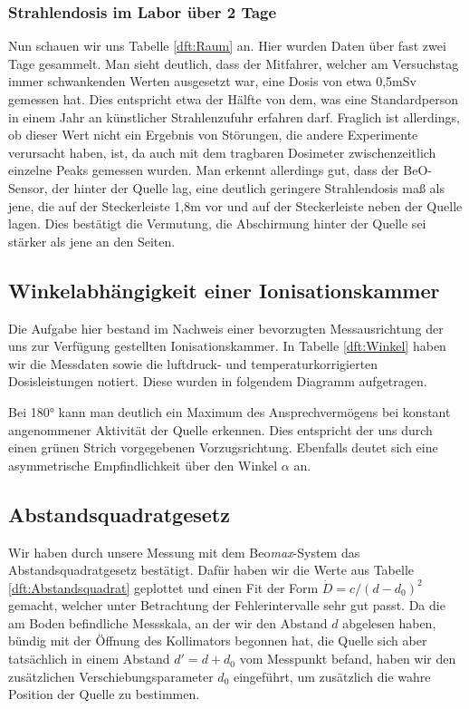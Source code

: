 \subsubsection{Strahlendosis im Labor über 2 Tage}
Nun schauen wir uns Tabelle \ref{dft:Raum} an. Hier wurden Daten über fast zwei Tage gesammelt. Man sieht 
deutlich, dass der Mitfahrer, welcher am Versuchstag immer schwankenden Werten ausgesetzt war, eine Dosis von 
etwa 0,5mSv gemessen hat. Dies entspricht etwa der Hälfte von dem, was eine Standardperson in einem Jahr an 
künstlicher Strahlenzufuhr erfahren darf. Fraglich ist allerdings, ob dieser Wert nicht ein Ergebnis von Störungen, 
die andere Experimente verursacht haben, ist, da auch mit dem tragbaren Dosimeter zwischenzeitlich einzelne Peaks gemessen wurden.
Man erkennt allerdings gut, dass der BeO-Sensor, der hinter der Quelle lag, eine deutlich geringere Strahlendosis maß als jene, die auf der Steckerleiste 1,8m vor und auf der Steckerleiste neben der Quelle lagen. Dies bestätigt die Vermutung, die Abschirmung hinter der Quelle sei stärker als jene an den Seiten.

\subsection{Winkelabhängigkeit einer Ionisationskammer}
    Die Aufgabe hier bestand im Nachweis einer bevorzugten Messausrichtung der uns zur Verfügung gestellten Ionisationskammer. In Tabelle \ref{dft:Winkel} haben wir die Messdaten sowie die luftdruck- und temperaturkorrigierten Dosisleistungen notiert.
    Diese wurden in folgendem Diagramm aufgetragen.

    \begin{center}
        \minipanf
                \makebox[\textwidth]{} %
                \label{auswd:Winkel}
        \minipend
    \end{center}
    \vspace{3mm}
    Bei 180° kann man deutlich ein Maximum des Ansprechvermögens bei konstant angenommener Aktivität der Quelle erkennen. Dies entspricht der uns durch einen grünen Strich vorgegebenen Vorzugsrichtung. Ebenfalls deutet sich eine asymmetrische Empfindlichkeit über den Winkel $\alpha$ an. 


\subsection{Abstandsquadratgesetz}
Wir haben durch unsere Messung mit dem Beo\textit{max}-System das Abstandsquadratgesetz bestätigt. Dafür haben wir die Werte aus Tabelle \ref{dft:Abstandsquadrat} geplottet und einen Fit der Form $\dot{D} = c/(d-d_0)^2$ gemacht, welcher unter Betrachtung der Fehlerintervalle sehr gut passt. Da die am Boden befindliche Messskala, an der wir den Abstand $d$ abgelesen haben, bündig mit der Öffnung des Kollimators begonnen hat, die Quelle sich aber tatsächlich in einem Abstand $d' = d + d_0$ vom Messpunkt befand, haben wir den zusätzlichen Verschiebungsparameter $d_0$ eingeführt, um zusätzlich die wahre Position der Quelle zu bestimmen.

